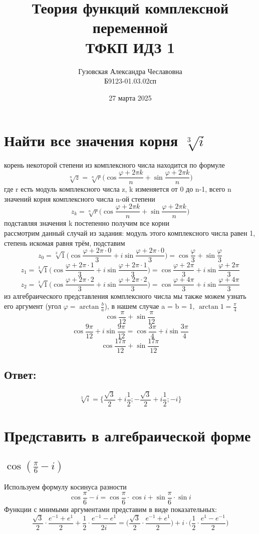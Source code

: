 \documentclass[12pt]{article}
\title{Теория функций комплексной переменной\\ ТФКП ИДЗ 1}
\author{Гузовская Александра Чеславовна\\Б9123-01.03.02сп}
\date{27 марта 2025}
\begin{document}
\maketitle
\section{Найти все значения корня $\sqrt[3]{i}$}
корень некоторой степени из комплексного числа находится по формуле
$$\sqrt[n]{z} = \sqrt[n]{r}\bigg(\cos{\frac{\varphi+2\pi k}{n}}+ \sin{\frac{\varphi+2\pi k}{n}}\bigg)$$
где r есть модуль комплексного числа z, k изменяется от 0 до n-1, всего n значений корня комплексного числа n-ой степени
$$z_k = \sqrt[n]{r}\bigg(\cos{\frac{\varphi+2\pi k}{n}} + \sin{\frac{\varphi+2\pi k}{n}}\bigg)$$
подставляя значения k постепенно получим все корни\\
рассмотрим данный случай из задания: модуль этого комплексного числа равен 1, степень искомая равня трём, подставим\\
$$z_0 = \sqrt[3]{1}\bigg(\cos{\frac{\varphi+2\pi \cdot 0}{3}}+ i\sin{\frac{\varphi+2\pi \cdot 0}{3}}\bigg) = \cos{\frac{\varphi}{3}} + \sin{\frac{\varphi}{3}}$$
$$z_1 = \sqrt[3]{1}\bigg(\cos{\frac{\varphi+2\pi \cdot 1}{3}}+ i\sin{\frac{\varphi+2\pi \cdot 1}{3}}\bigg) = \cos{\frac{\varphi + 2\pi}{3}} + i\sin{\frac{\varphi + 2\pi}{3}}$$
$$z_2 = \sqrt[3]{1}\bigg(\cos{\frac{\varphi+2\pi \cdot 2}{3}}+ i\sin{\frac{\varphi+2\pi \cdot 2}{3}}\bigg) = \cos{\frac{\varphi + 4\pi}{3}} + i\sin{\frac{\varphi + 4\pi}{3}}$$
из алгебраического представления комплексного числа мы также можем узнать его аргумент (угол $\varphi = \arctan{\frac{b}{a}}$), в нашем случае a = b = 1, $\arctan{1} = \frac{\pi}{4}$\\
$$\cos{\frac{\pi}{12}} + \sin{\frac{\pi}{12}}$$
$$\cos{\frac{9\pi}{12}} + i\sin{\frac{9\pi}{12}} = \cos{\frac{3\pi}{4}} + i\sin{\frac{3\pi}{4}}$$
$$\cos{\frac{17\pi}{12}} + \sin{\frac{17\pi}{12}}$$
\subsection*{Ответ:} 
$$\sqrt[3]{i} = \{ \frac{\sqrt{3}}{2} + i\frac{1}{2}; -\frac{\sqrt{3}}{2} + i\frac{1}{2}; -i \}$$

\section{Представить в алгебраической форме}
\subsection{ $\cos{(\frac{\pi}{6} - i)}$}
Используем формулу косинуса разности\\
$$\cos{\frac{\pi}{6} - i} = \cos{\frac{\pi}{6}} \cdot \cos{i} + \sin{\frac{\pi}{6}} \cdot \sin{i}$$
Функции с мнимыми аргументами представим в виде показательных:\\
$$\frac{\sqrt{3}}{2} \cdot \frac{e^{-1} + e^1}{2} + \frac{1}{2} \cdot \frac{e^{-1} - e^1}{2i} = \bigg(\frac{\sqrt{3}}{2} \cdot \frac{e^{-1} + e^1}{2} \bigg) + i \cdot \bigg(\frac{1}{2} \cdot \frac{e^1 - e^{-1}}{2}\bigg)$$
\end{document}

